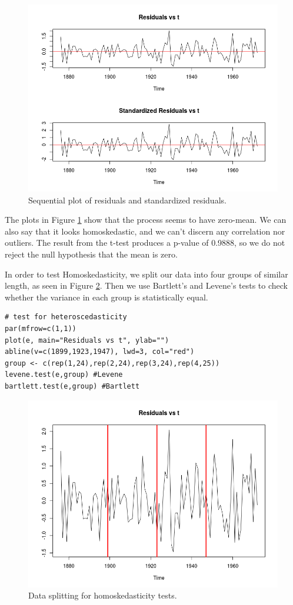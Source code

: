 \documentclass[]{article}
\begin{document}
\begin{figure}[!ht]
\centering
\includegraphics[width=.8\textwidth]{huronseq.png}
\caption{Sequential plot of residuals and standardized residuals.}
\label{huronseq}
\end{figure}

The plots in Figure \ref{huronseq} show that the process seems to have zero-mean. We can also say that it looks homoskedastic, and we can't discern any correlation nor outliers. The result from the t-test produces a p-value of 0.9888, so we do not reject the null hypothesis that the mean is zero.

In order to test Homoskedasticity, we split our data into four groups of similar length, as seen in Figure \ref{huronhomo}. Then we use Bartlett's and Levene's tests to check whether the variance in each group is statistically equal.
\begin{Verbatim}[frame=single]
# test for heteroscedasticity
par(mfrow=c(1,1))
plot(e, main="Residuals vs t", ylab="")
abline(v=c(1899,1923,1947), lwd=3, col="red")
group <- c(rep(1,24),rep(2,24),rep(3,24),rep(4,25))
levene.test(e,group) #Levene 
bartlett.test(e,group) #Bartlett 
\end{Verbatim}

\begin{figure}[!ht]
\centering
\includegraphics[width=.8\textwidth]{huronhomo.png}
\caption{Data splitting for homoskedasticity tests.}
\label{huronhomo}
\end{figure}
\end{document}

